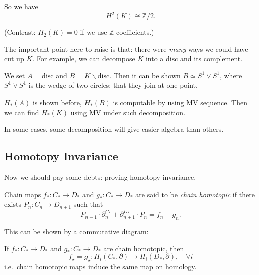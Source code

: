 \documentclass[a4paper,11pt]{article}
\begin{document}
	So we have
	\[
		H^2(K) \cong \mathbb{Z}/2.
	\]
	
	(Contrast: $H_2(K) = 0$ if we use $\mathbb{Z}$ coefficients.)

	\begin{nt}
		The important point here to raise is that: there were \emph{many} ways we could have cut up $K$. For example, we can decompose $K$ into a disc and its complement.


		We set $A = \text{disc}$ and $B = K \backslash \text{disc}$. Then it can be shown $B \simeq S^1 \vee S^1$,
		where $S^1 \vee S^1$ is the wedge of two circles: that they join at one point. 

		$H_*(A)$ is shown before, $H_*(B)$ is computable by using MV sequence. Then we can find $H_*(K)$ using MV under such decomposition.

		In some cases, some decomposition will give easier algebra than others.
	\end{nt}

	\subsection{Homotopy Invariance}

	Now we should pay some debts: proving homotopy invariance.

	\begin{defi}
		Chain maps $f_* : C_* \to D_*$ and $g_* : C_* \to D_*$ are said to be \emph{chain homotopic} if there exists $P_n : C_n \to D _{n+1}$ such that 
		\[
			P _{n-1} \cdot \partial_n ^{C_*} \pm \partial _{n+1}^{D_*} \cdot P_n = f_n - g_n.
		\]

		This can be shown by a commutative diagram:
		\begin{center}
		\end{center}
	\end{defi}

	\begin{lem}
		If $f_* : C_* \to D_*$ and $g_* : C_* \to D_*$ are chain homotopic, then
		\[
			f_\star = g_\star : H_i(C_*, \partial) \to H_i(D_*, \partial), \quad \forall i
		\]
		i.e.\ chain homotopic maps induce the same map on homology.
	\end{lem}
\end{document}
